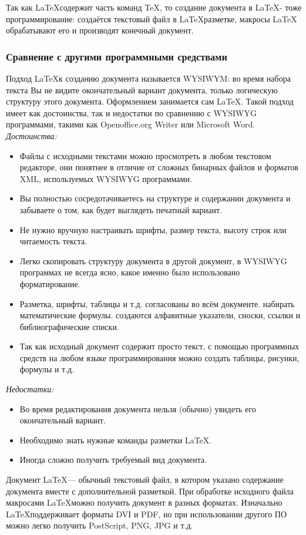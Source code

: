 \documentclass{article}
\begin{document}
	Так как \LaTeX содержит часть команд \TeX, то создание документа в \LaTeX - тоже программирование: создаётся текстовый файл в \LaTeX разметке, макросы LaTeX обрабатывают его и производят конечный документ.\\
		\subsubsection{Сравнение с другими программными средствами}
	Подход \LaTeX к созданию документа называется WYSIWYM: во время набора текста Вы не видите окончательный вариант документа, только логическую структуру этого документа. Оформлением занимается сам \LaTeX. Такой подход имеет как достоинства, так и недостатки по сравнению с WYSIWYG программами, такими как Openoffice.org Writer или Microsoft Word.\\

	\textit{Достоинства:}
	\begin{itemize}
   		\item Файлы с исходными текстами можно просмотреть в любом текстовом редакторе, они понятнее в отличие от сложных бинарных файлов и форматов XML, используемых WYSIWYG программами.
   		\item Вы полностью сосредотачиваетесь на структуре и содержании документа и забываете о том, как будет выглядеть печатный вариант.
   		\item Не нужно вручную настраивать шрифты, размер текста, высоту строк или читаемость текста.
   		\item Легко скопировать структуру документа в другой документ, в WYSIWYG программах не всегда ясно, какое именно было использовано форматирование.
   		\item Разметка, шрифты, таблицы и т.д. согласованы во всём документе.
    	 набирать математические формулы.
    	 создаются алфавитные указатели, сноски, ссылки и библиографические списки.
   		\item Так как исходный документ содержит просто текст, с помощью программных средств на любом языке программирования можно создать таблицы, рисунки, формулы и т.д.
	\end{itemize}	
	\textit{Недостатки:}
	\begin{itemize}
		\item Во время редактирования документа нельзя (обычно) увидеть его окончательный вариант.
   		\item Необходимо знать нужные команды разметки \LaTeX.
   		\item Иногда сложно получить требуемый вид документа.
	\end{itemize}
	Документ \LaTeX — обычный текстовый файл, в котором указано содержание документа вместе с дополнительной разметкой. При обработке исходного файла макросами \LaTeX можно получить документ в разных форматах. Изначально \LaTeX поддерживает форматы DVI и PDF, но при использовании другого ПО можно легко получить PostScript, PNG, JPG и т.д.
\end{document}
